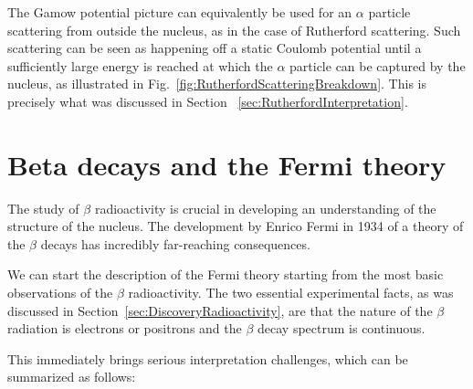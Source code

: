 The Gamow potential picture can equivalently be used for an $\alpha$ particle scattering from outside the nucleus, as in the case of Rutherford scattering. Such scattering can be seen as happening off a static Coulomb potential until a sufficiently large energy is reached at which the $\alpha$ particle can be captured by the nucleus, as illustrated in Fig.~\ref{fig:RutherfordScatteringBreakdown}. This is precisely what was discussed in Section
~\ref{sec:RutherfordInterpretation}. 

\section{Beta decays and the Fermi theory}
\label{sec:FermiTheory}

The study of  $\beta$ radioactivity is crucial in developing an understanding of the structure of the nucleus. The development by Enrico Fermi in 1934 of a theory of the $\beta$ decays has incredibly far-reaching consequences.

We can start the description of the Fermi theory starting from the most basic observations of the $\beta$ radioactivity. The two essential experimental facts, as was discussed in Section~\ref{sec:DiscoveryRadioactivity}, are that the nature of the $\beta$ radiation is electrons or positrons and the $\beta$ decay spectrum is continuous.

This immediately brings serious interpretation challenges, which can be summarized as follows:

